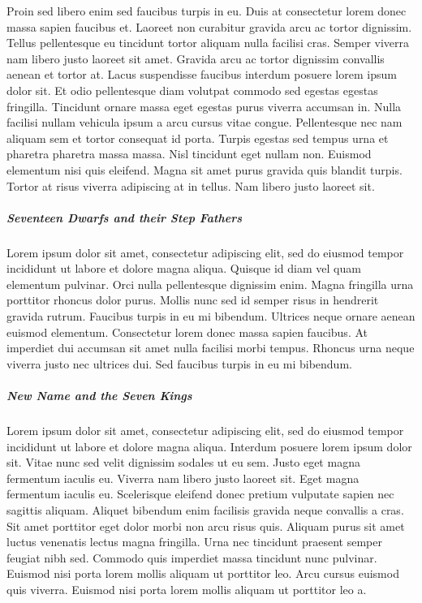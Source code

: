 \documentclass[a4paper, oneside, 10pt]{report}
\begin{document}
				Proin sed libero enim sed faucibus turpis in eu. Duis at consectetur lorem donec massa sapien faucibus et. Laoreet non curabitur gravida arcu ac tortor dignissim. Tellus pellentesque eu tincidunt tortor aliquam nulla facilisi cras. Semper viverra nam libero justo laoreet sit amet. Gravida arcu ac tortor dignissim convallis aenean et tortor at. Lacus suspendisse faucibus interdum posuere lorem ipsum dolor sit. Et odio pellentesque diam volutpat commodo sed egestas egestas fringilla. Tincidunt ornare massa eget egestas purus viverra accumsan in. Nulla facilisi nullam vehicula ipsum a arcu cursus vitae congue. Pellentesque nec nam aliquam sem et tortor consequat id porta. Turpis egestas sed tempus urna et pharetra pharetra massa massa. Nisl tincidunt eget nullam non. Euismod elementum nisi quis eleifend. Magna sit amet purus gravida quis blandit turpis. Tortor at risus viverra adipiscing at in tellus. Nam libero justo laoreet sit.

		\subparagraph {Seventeen Dwarfs and their Step Fathers}
				Lorem ipsum dolor sit amet, consectetur adipiscing elit, sed do eiusmod tempor incididunt ut labore et dolore magna aliqua. Quisque id diam vel quam elementum pulvinar. Orci nulla pellentesque dignissim enim. Magna fringilla urna porttitor rhoncus dolor purus. Mollis nunc sed id semper risus in hendrerit gravida rutrum. Faucibus turpis in eu mi bibendum. Ultrices neque ornare aenean euismod elementum. Consectetur lorem donec massa sapien faucibus. At imperdiet dui accumsan sit amet nulla facilisi morbi tempus. Rhoncus urna neque viverra justo nec ultrices dui. Sed faucibus turpis in eu mi bibendum.

		\subparagraph [New Name] {New Name and the Seven Kings}
				Lorem ipsum dolor sit amet, consectetur adipiscing elit, sed do eiusmod tempor incididunt ut labore et dolore magna aliqua. Interdum posuere lorem ipsum dolor sit. Vitae nunc sed velit dignissim sodales ut eu sem. Justo eget magna fermentum iaculis eu. Viverra nam libero justo laoreet sit. Eget magna fermentum iaculis eu. Scelerisque eleifend donec pretium vulputate sapien nec sagittis aliquam. Aliquet bibendum enim facilisis gravida neque convallis a cras. Sit amet porttitor eget dolor morbi non arcu risus quis. Aliquam purus sit amet luctus venenatis lectus magna fringilla. Urna nec tincidunt praesent semper feugiat nibh sed. Commodo quis imperdiet massa tincidunt nunc pulvinar. Euismod nisi porta lorem mollis aliquam ut porttitor leo. Arcu cursus euismod quis viverra. Euismod nisi porta lorem mollis aliquam ut porttitor leo a.
\end{document}
